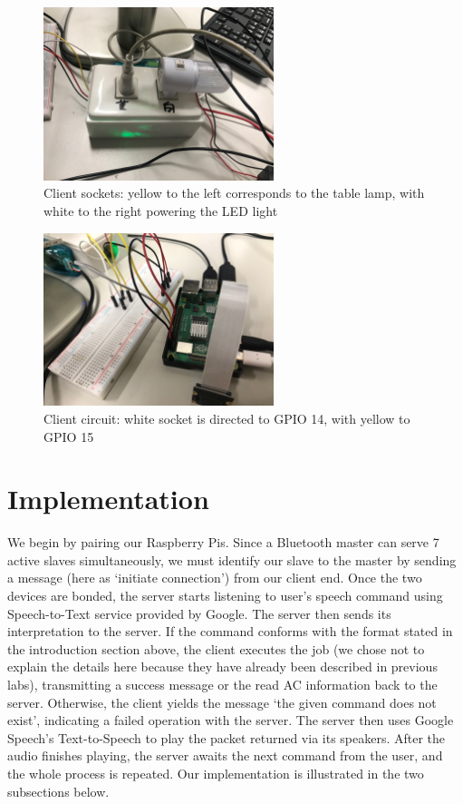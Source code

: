 \documentclass[12pt, a4paper, onside]{article}
\begin{document}
\begin{figure}[h]
  \centering
  \includegraphics[angle=180, origin=c, width=0.6\textwidth]{img/client_sockets}
  \caption{Client sockets: yellow to the left corresponds to the table lamp, with white to the right powering the LED light}
\end{figure}
\begin{figure}[h]
  \centering
  \includegraphics[angle=180, origin=c, width=0.6\textwidth]{img/client_circuit}
  \caption{Client circuit: white socket is directed to GPIO 14, with yellow to GPIO 15}
\end{figure}

\clearpage

\section{Implementation}
We begin by pairing our Raspberry Pis. Since a Bluetooth master can serve 7 active slaves simultaneously, we must identify our slave to the master by sending a message (here as `initiate connection') from our client end. Once the two devices are bonded, the server starts listening to user's speech command using Speech-to-Text service provided by Google. The server then sends its interpretation to the server. If the command conforms with the format stated in the introduction section above, the client executes the job (we chose not to explain the details here because they have already been described in previous labs), transmitting a success message or the read AC information back to the server. Otherwise, the client yields the message `the given command does not exist', indicating a failed operation with the server. The server then uses Google Speech's Text-to-Speech to play the packet returned via its speakers. After the audio finishes playing, the server awaits the next command from the user, and the whole process is repeated. Our implementation is illustrated in the two subsections below.
\end{document}
